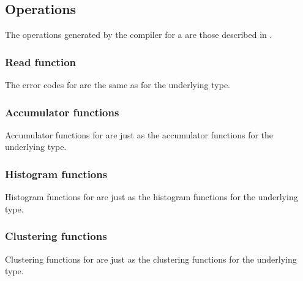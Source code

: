 \subsection{Operations}
The operations generated by the \pads{} compiler for a \Ptry{} are
those described in .


\subsubsection{Read function}
The error codes for \Ptry{} are the same as for the underlying type.

\subsubsection{Accumulator functions}
Accumulator functions for \Ptry{} are just as the accumulator
functions for the underlying type.

\subsubsection{Histogram functions}
Histogram functions for \Ptry{} are just as the histogram functions
for the underlying type.

\subsubsection{Clustering functions}
Clustering functions for \Ptry{} are just as the clustering
functions for the underlying type.

